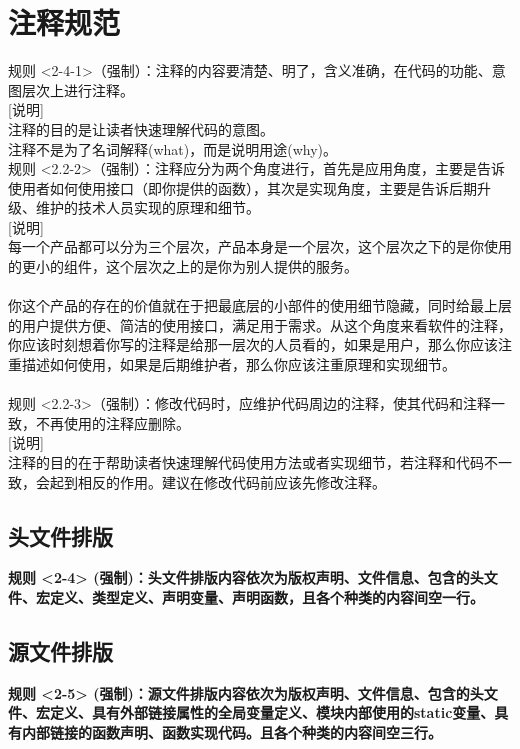 \section{注释规范}
规则 <2-4-1>（强制）：注释的内容要清楚、明了，含义准确，在代码的功能、意图层次上进行注释。\\

[说明]\\
注释的目的是让读者快速理解代码的意图。\\
注释不是为了名词解释(what)，而是说明用途(why)。\\

规则 <2.2-2>（强制）：注释应分为两个角度进行，首先是应用角度，主要是告诉使用者如何使用接口（即你提供的函数），其次是实现角度，主要是告诉后期升级、维护的技术人员实现的原理和细节。\\

[说明]\\
每一个产品都可以分为三个层次，产品本身是一个层次，这个层次之下的是你使用的更小的组件，这个层次之上的是你为别人提供的服务。\\
\\
你这个产品的存在的价值就在于把最底层的小部件的使用细节隐藏，同时给最上层的用户提供方便、简洁的使用接口，满足用于需求。从这个角度来看软件的注释，你应该时刻想着你写的注释是给那一层次的人员看的，如果是用户，那么你应该注重描述如何使用，如果是后期维护者，那么你应该注重原理和实现细节。\\
\\
规则 <2.2-3>（强制）：修改代码时，应维护代码周边的注释，使其代码和注释一致，不再使用的注释应删除。\\

[说明]\\
注释的目的在于帮助读者快速理解代码使用方法或者实现细节，若注释和代码不一致，会起到相反的作用。建议在修改代码前应该先修改注释。

\subsection{头文件排版}
\textbf{规则 <2-4> (强制)：头文件排版内容依次为版权声明、文件信息、包含的头文件、宏定义、类型定义、声明变量、声明函数，且各个种类的内容间空一行。}

\subsection{源文件排版}
\textbf{规则 <2-5> (强制)：源文件排版内容依次为版权声明、文件信息、包含的头文件、宏定义、具有外部链接属性的全局变量定义、模块内部使用的static变量、具有内部链接的函数声明、函数实现代码。且各个种类的内容间空三行。}
